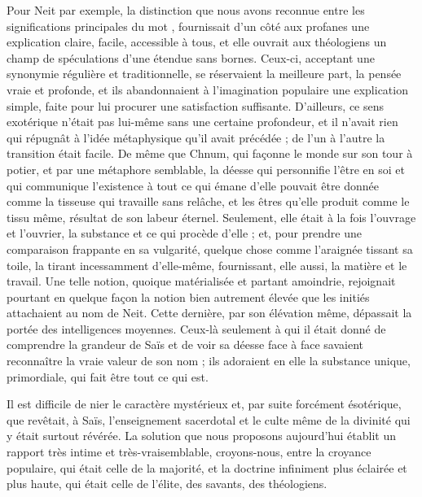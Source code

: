 \documentclass[letterpaper,twocolumn,openany,nodeprecatedcode]{dndbook}
\newcommand*\hieroAAAQ{}
\begin{document}
Pour Neit par exemple, la distinction que nous avons reconnue entre les significations principales du mot $\hieroAAAQ$, fournissait d'un côté aux profanes une explication claire, facile, accessible à tous, et elle ouvrait aux théologiens un champ de spéculations d'une étendue sans bornes. Ceux-ci, acceptant une synonymie régulière et traditionnelle, se réservaient la meilleure part, la pensée vraie et profonde, et ils abandonnaient à l'imagination populaire une explication simple, faite pour lui procurer une satisfaction suffisante. D'ailleurs, ce sens exotérique n'était pas lui-même sans une certaine profondeur, et il n'avait rien qui répugnât à l'idée métaphysique qu'il avait précédée ; de l'un à l'autre la transition était facile. De même que Chnum, qui façonne le monde sur son tour à potier, et par une métaphore semblable, la déesse qui personnifie l'être en soi et qui communique l'existence à tout ce qui émane d'elle pouvait être donnée comme la tisseuse qui travaille sans relâche, et les êtres qu'elle produit comme le tissu même, résultat de son labeur éternel. Seulement, elle était à la fois l'ouvrage et l'ouvrier, la substance et ce qui procède d'elle ; et, pour prendre une comparaison frappante en sa vulgarité, quelque chose comme l'araignée tissant sa toile, la tirant incessamment d'elle-même, fournissant, elle aussi, la matière et le travail. Une telle notion, quoique matérialisée et partant amoindrie, rejoignait pourtant en quelque façon la notion bien autrement élevée que les initiés attachaient au nom de Neit. Cette dernière, par son élévation même, dépassait la portée des intelligences moyennes. Ceux-là seulement à qui il était donné de comprendre la grandeur de Saïs et de voir sa déesse face à face savaient reconnaître la vraie valeur de son nom ; ils adoraient en elle la substance unique, primordiale, qui fait être tout ce qui est.

Il est difficile de nier le caractère mystérieux et, par suite forcément ésotérique, que revêtait, à Saïs, l'enseignement sacerdotal et le culte même de la divinité qui y était surtout révérée. La solution que nous proposons aujourd'hui établit un rapport très intime et très-vraisemblable, croyons-nous, entre la croyance populaire, qui était celle de la majorité, et la doctrine infiniment plus éclairée et plus haute, qui était celle de l'élite, des savants, des théologiens.
\end{document}
